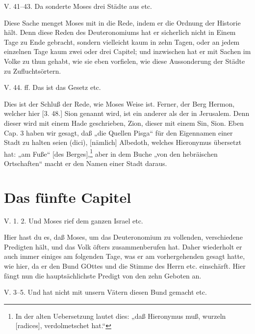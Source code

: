 \begin{schriftzitat}
V. 41–43. Da sonderte Moses drei Städte aus etc.
\end{schriftzitat}

Diese Sache menget Moses mit in die Rede, indem er die Ordnung der Historie hält. Denn diese Reden des Deuteronomiums hat er sicherlich nicht in Einem Tage zu Ende gebracht, sondern vielleicht kaum in zehn Tagen, oder an jedem einzelnen Tage kaum zwei oder drei Capitel; und inzwischen hat er mit Sachen im Volke zu thun gehabt, wie sie eben vorfielen, wie diese Aussonderung der Städte zu Zufluchtsörtern.

\begin{schriftzitat}
V. 44. ff. Das ist das Gesetz etc.
\end{schriftzitat}

Dies ist der Schluß der Rede, wie Moses Weise ist. Ferner, der Berg Hermon, welcher hier [3. 48.] Sion genannt wird, ist ein anderer als der in Jerusalem. Denn dieser wird mit einem Hade geschrieben, Zion, dieser mit einem Sin, Sion. Eben Cap. 3 haben wir gesagt, daß „die Quellen Pisga“ für den Eigennamen einer Stadt zu halten seien (dici), [nämlich] Albedoth, welches Hieronymus übersetzt hat: „am Fuße“ [des Berges],\footnote{In der alten Uebersetzung lautet dies: „daß Hieronymus muß, wurzeln [radices], verdolmetschet hat.“} aber in dem Buche „von den hebräischen Ortschaften“ macht er den Namen einer Stadt daraus.

\section{Das fünfte Capitel}

\begin{schriftzitat}
V. 1. 2. Und Moses rief dem ganzen Israel etc.
\end{schriftzitat}

Hier hast du es, daß Moses, um das Deuteronomium zu vollenden, verschiedene Predigten hält, und das Volk öfters zusammenberufen hat. Daher wiederholt er auch immer einiges am folgenden Tage, was er am vorhergehenden gesagt hatte, wie hier, da er den Bund GOttes und die Stimme des Herrn etc. einschärft. Hier fängt nun die hauptsächlichste Predigt von den zehn Geboten an.

\begin{schriftzitat}
V. 3–5. Und hat nicht mit unsern Vätern diesen Bund gemacht etc.
\end{schriftzitat}

